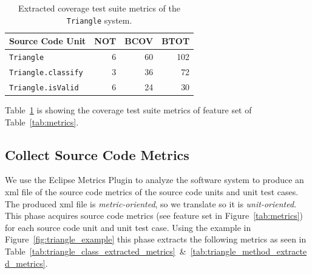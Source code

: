 \begin{table}[h]
  \centering
  \begin{tabular}{|l|r|r|r|}
    \hline
    \rowcolor[RGB]{169,196,223}
    \textbf{Source Code Unit} & \textbf{NOT} & \textbf{BCOV} & \textbf{BTOT} \\
    \hline \texttt{Triangle} & 6 & 60 & 102 \\
    \hline \texttt{Triangle.classify} & 3 & 36 & 72 \\
    \hline \texttt{Triangle.isValid} & 6 & 24 & 30 \\
    \hline
  \end{tabular}
  \caption{Extracted coverage test suite metrics of the \texttt{Triangle} system.}
  \vspace{1mm}
  \footnotesize{Table~\ref{tab:triangle_coverage_metrics} is showing the coverage test suite metrics of feature set  of Table~\ref{tab:metrics}.}
  \vspace{1mm}
  \label{tab:triangle_coverage_metrics}
\end{table}


\subsection{Collect Source Code Metrics}
\label{subsec:approach_collect_source_metrics}
We use the Eclipse Metrics Plugin to analyze the software system to produce an \gls{xml} file of the source code metrics of the source code units and unit test cases. The produced \gls{xml} file is \emph{metric-oriented}, so we translate so it is \emph{unit-oriented}. This phase acquires source code metrics (see feature set  in Figure~\ref{tab:metrics}) for each source code unit and unit test case. Using the example in Figure~\ref{fig:triangle_example} this phase extracts the following metrics as seen in Table~\ref{tab:triangle_class_extracted_metrics}~\&~\ref{tab:triangle_method_extracted_metrics}.

